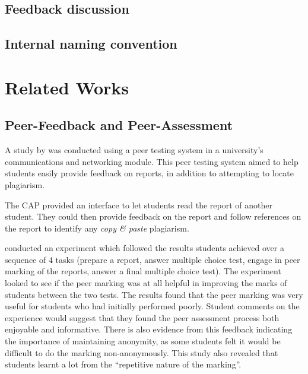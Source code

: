\documentclass[sigplan,10pt,review]{acmart}\settopmatter{printfolios=true}
\begin{document}
\subsection{Feedback discussion}


\subsection{Internal naming convention}

\section{Related Works}

\subsection{Peer-Feedback and Peer-Assessment}







A study by \citet{davies_computerized_2000} was conducted using a peer
testing system in a university's communications and networking
module. This peer testing system aimed to help students easily provide
feedback on reports, in addition to attempting to locate plagiarism.

The \ac{CAP} provided an interface to let students read the report of
another student. They could then provide feedback on the report and
follow references on the report to identify any \textit{copy \& paste}
plagiarism.

\citet{davies_computerized_2000} conducted an experiment which
followed the results students achieved over a sequence of 4 tasks
(prepare a report, answer multiple choice test, engage in peer marking
of the reports, answer a final multiple choice test).  The experiment
looked to see if the peer marking was at all helpful in improving the
marks of students between the two tests. The results found that the
peer marking was very useful for students who had initially performed
poorly. Student comments on the experience would suggest that they
found the peer assessment process both enjoyable and
informative. There is also evidence from this feedback indicating the
importance of maintaining anonymity, as some students felt it would be
difficult to do the marking non-anonymously.  This study also revealed
that students learnt a lot from the ``repetitive nature of the
marking''.
\end{document}
